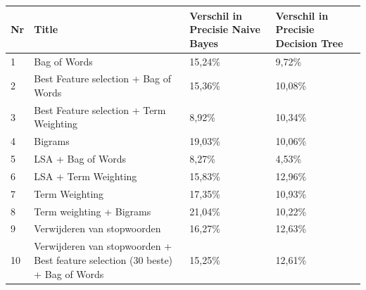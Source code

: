 \begin{table}[H]
\centering
\begin{adjustbox}{width=1\textwidth}
\begin{tabular}{|l|l|l|l|}
\hline
{\bf Nr} & {\bf Title}                                                                      & {\bf Verschil in Precisie Naive Bayes} & {\bf Verschil in Precisie Decision Tree} \\ \hline
1        & Bag of Words                                                                     & 15,24\%                                & 9,72\%                                   \\ \hline
2        & Best Feature selection + Bag of Words                                            & 15,36\%                                & 10,08\%                                  \\ \hline
3        & Best Feature selection + Term Weighting                                          & 8,92\%                                 & 10,34\%                                  \\ \hline
4        & Bigrams                                                                          & 19,03\%                                & 10,06\%                                  \\ \hline
5        & LSA + Bag of Words                                                               & 8,27\%                                 & 4,53\%                                   \\ \hline
6        & LSA + Term Weighting                                                             & 15,83\%                                & 12,96\%                                  \\ \hline
7        & Term Weighting                                                                   & 17,35\%                                & 10,93\%                                  \\ \hline
8        & Term weighting  + Bigrams                                                        & 21,04\%                                & 10,22\%                                  \\ \hline
9        & Verwijderen van stopwoorden                                                      & 16,27\%                                & 12,63\%                                  \\ \hline
10       & Verwijderen van stopwoorden + Best feature selection (30 beste) + Bag of Words   & 15,25\%                                & 12,61\%                                  \\ \hline

\end{tabular}
\end{adjustbox}
\end{table}
